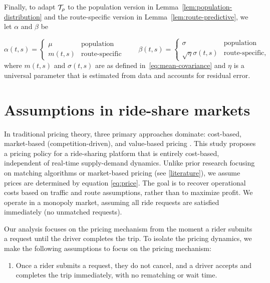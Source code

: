 \documentclass[12pt]{article}
\begin{document}
{{{{{Finally, to adapt $\mathcal{T}_\rho$ to the population version in Lemma~\ref{lem:population-distribution} and the route-specific version in Lemma~\ref{lem:route-predictive}, we let $\alpha$ and $\beta$ be 

\begin{equation}\label{eq:mean-variance-sde}
    \alpha(t,s) = 
    \begin{cases}
        \mu & \text{population} \\
        m(t,s) & \text{route-specific}
    \end{cases}
    \qquad 
    \beta(t,s) = 
    \begin{cases}
        \sigma & \text{population}        \\
        \sqrt{\eta}\sigma(t,s) & \text{route-specific},
    \end{cases}
\end{equation}
where $m(t,s)$ and $\sigma(t,s)$ are as defined in~\eqref{eq:mean-covariance} and $\eta$ is a universal parameter that is estimated from data and accounts for residual error. 


\section{Assumptions in ride-share markets}
In traditional pricing theory, three primary approaches dominate: cost-based, market-based (competition-driven), and value-based pricing \cite{phillips2021pricing}. This study proposes a pricing policy for a ride-sharing platform that is entirely cost-based, independent of real-time supply-demand dynamics. Unlike prior research focusing on matching algorithms or market-based pricing (see \ref{literature}), we assume prices are determined by equation \eqref{eq:price}. The goal is to recover operational costs based on traffic and route assumptions, rather than to maximize profit. We operate in a monopoly market, assuming all ride requests are satisfied immediately (no unmatched requests).


Our analysis focuses on the pricing mechanism from the moment a rider submits a request until the driver completes the trip. To isolate the pricing dynamics, we make the following   assumptions to focus  on the pricing mechanism:
\begin{enumerate}[label={(A$_{\arabic*}$)}, ref={(A$_{\arabic*}$)}]  
	\label{monopoly}
	\item Once a rider submits a request, they do not cancel, and a driver accepts and completes the trip immediately, with no rematching or wait time.
	

\end{enumerate}}}}}}
\end{document}
